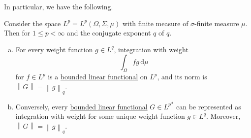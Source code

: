 In particular, we have the following.
\begin{theorem}[\({L^{p}}^{\ast} = L^q\)]\label{thm:lec6}
	Consider the space \(L^p = L^p(\Omega , \Sigma , \mu )\) with finite measure of \(\sigma \)-finite measure \(\mu \). Then for \(1 \leq p < \infty \) and the conjugate exponent \(q \) of \(q\).
	\begin{enumerate}[(a)]
		\item For every weight function \(g\in L^q\), integration with weight
		      \[
			      \int _\Omega fg\,\mathrm{d} \mu
		      \]
		      for \(f\in L^p\) is a \hyperref[def:bounded-linear-functional]{bounded linear functional} on \(L^p\), and its norm is \(\left\lVert G\right\rVert = \left\lVert g\right\rVert _q\).
		\item Conversely, every \hyperref[def:bounded-linear-functional]{bounded linear functional} \(G\in {L^p}^{\ast}\) can be represented as integration with weight for some unique weight function \(g\in L^q\). Moreover, \(\left\lVert G\right\rVert = \left\lVert g\right\rVert _q\).
	\end{enumerate}
\end{theorem}